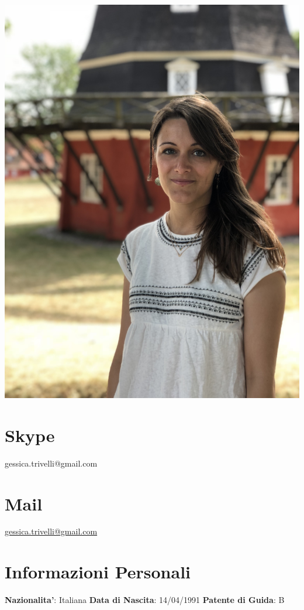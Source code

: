 \documentclass[11pt]{friggeri-cv}
\begin{document}

\begin{aside}
  \includegraphics[width=0.95\columnwidth]{img/IMG_2838}
  \section{Skype}{\footnotesize{
    gessica.trivelli@gmail.com}}
  \section{Mail}{\footnotesize{
    \href{mailto:gessica.trivelli@gmail.com}{gessica.trivelli@gmail.com}}}
  \section{Informazioni Personali}\footnotesize{
    \textbf{Nazionalita'}: 
    Italiana
    \textbf{Data di Nascita}:
    14/04/1991
    \textbf{Patente di Guida}:
    B}
\end{aside}
\end{document}
